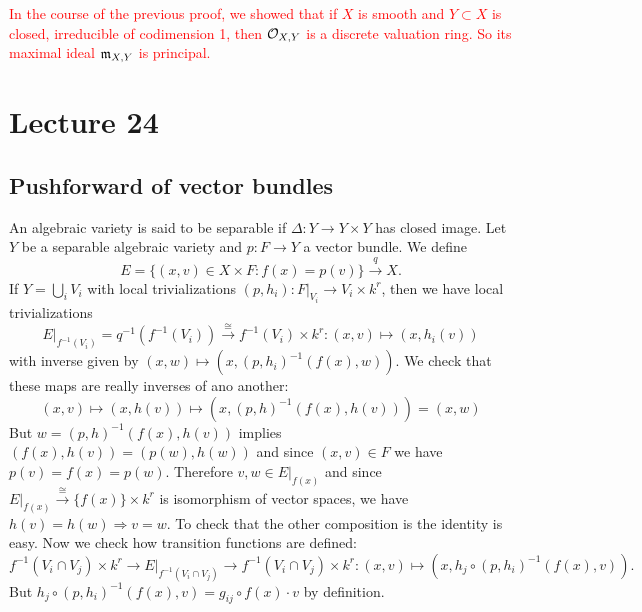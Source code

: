 \begin{remark}
   \textcolor{red}{In the course of the previous proof, we showed that if $X$ is smooth and $Y\subset X$ is closed, irreducible of 
    codimension 1, then $\mathcal{O}_{X,Y}$ is a discrete valuation ring. So its maximal ideal $\mathfrak{m}_{X,Y}$ 
    is principal.}
\end{remark}

\section{Lecture 24}

\subsection{Pushforward of vector bundles}
An algebraic variety is said to be separable if $\Delta:Y\to Y\times Y$ has closed image.  
Let $Y$ be a separable algebraic variety and $p:F\to Y$ a vector bundle. We define 
\begin{equation}
    E = \{(x,v)\in X\times F: f(x)=p(v)\} \overset{q}{\to} X. 
\end{equation}
If $Y = \bigcup_i V_i$ with local trivializations $(p,h_i): F|_{V_i}\to V_i\times k^r$, then we have 
local trivializations 
\begin{equation}
    E|_{f^{-1}(V_i)}=q^{-1}(f^{-1}(V_i))\overset{\cong}{\to}f^{-1}(V_i)\times k^r: (x,v)\mapsto (x,h_i(v))
\end{equation}
with inverse given by $(x,w)\mapsto (x,(p,h_i)^{-1}(f(x),w))$. We check that these maps are really inverses of 
ano another:
\begin{equation}
    (x,v)\mapsto (x,h(v))\mapsto (x,(p,h)^{-1}(f(x),h(v)))=(x,w)
\end{equation}
But $w = (p,h)^{-1}(f(x),h(v))$ implies $(f(x),h(v))=(p(w),h(w))$ and since $(x,v)\in F$ we have 
$p(v)=f(x)=p(w)$. Therefore $v,w\in E|_{f(x)}$ and since $E|_{f(x)}\overset{\cong}{\to}\{f(x)\}\times k^r$ is 
isomorphism of vector spaces, we have $h(v)=h(w)\Rightarrow v = w$. To check that the other composition is 
the identity is easy. Now we check how transition functions are defined:
\begin{equation}
    f^{-1}(V_i\cap V_j)\times k^r \to E|_{f^{-1}(V_i\cap V_j)}\to f^{-1}(V_i\cap V_j)\times k^r:
    (x,v)\mapsto (x, h_j\circ (p, h_i)^{-1}(f(x),v)).
\end{equation}
But $h_j\circ (p, h_i)^{-1}(f(x),v)=g_{ij}\circ f(x)\cdot v$ by definition.\par 

